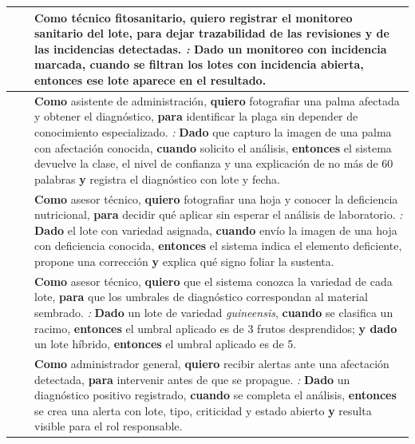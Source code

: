 \begin{longtable}{|C{1.3cm}|C{1.3cm}|L{12.4cm}|}
 &  & \textbf{Como} técnico fitosanitario, \textbf{quiero} registrar el monitoreo sanitario del lote, \textbf{para} dejar trazabilidad de las revisiones y de las incidencias detectadas. \newline \emph{:} \textbf{Dado} un monitoreo con incidencia marcada, \textbf{cuando} se filtran los lotes con incidencia abierta, \textbf{entonces} ese lote aparece en el resultado. \\ \hline

 &  & \textbf{Como} asistente de administración, \textbf{quiero} fotografiar una palma afectada y obtener el diagnóstico, \textbf{para} identificar la plaga sin depender de conocimiento especializado. \newline \emph{:} \textbf{Dado} que capturo la imagen de una palma con afectación conocida, \textbf{cuando} solicito el análisis, \textbf{entonces} el sistema devuelve la clase, el nivel de confianza y una explicación de no más de 60 palabras \textbf{y} registra el diagnóstico con lote y fecha. \\ \hline

 &  & \textbf{Como} asesor técnico, \textbf{quiero} fotografiar una hoja y conocer la deficiencia nutricional, \textbf{para} decidir qué aplicar sin esperar el análisis de laboratorio. \newline \emph{:} \textbf{Dado} el lote con variedad asignada, \textbf{cuando} envío la imagen de una hoja con deficiencia conocida, \textbf{entonces} el sistema indica el elemento deficiente, propone una corrección \textbf{y} explica qué signo foliar la sustenta. \\ \hline

 &  & \textbf{Como} asesor técnico, \textbf{quiero} que el sistema conozca la variedad de cada lote, \textbf{para} que los umbrales de diagnóstico correspondan al material sembrado. \newline \emph{:} \textbf{Dado} un lote de variedad \emph{guineensis}, \textbf{cuando} se clasifica un racimo, \textbf{entonces} el umbral aplicado es de 3 frutos desprendidos; \textbf{y dado} un lote híbrido, \textbf{entonces} el umbral aplicado es de 5. \\ \hline

 &  & \textbf{Como} administrador general, \textbf{quiero} recibir alertas ante una afectación detectada, \textbf{para} intervenir antes de que se propague. \newline \emph{:} \textbf{Dado} un diagnóstico positivo registrado, \textbf{cuando} se completa el análisis, \textbf{entonces} se crea una alerta con lote, tipo, criticidad y estado abierto \textbf{y} resulta visible para el rol responsable. \\ \hline


\end{longtable}
